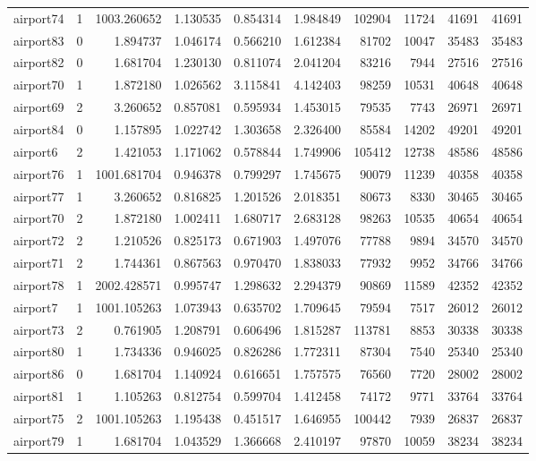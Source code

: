 \begin{longtable}{|l|r|r|r|r|r|r|r|r|r|}
airport74 & 1 & 1003.260652 & 1.130535 & 0.854314 & 1.984849 & 102904 & 11724 & 41691 & 41691 \\
airport83 & 0 & 1.894737 & 1.046174 & 0.566210 & 1.612384 & 81702 & 10047 & 35483 & 35483 \\
airport82 & 0 & 1.681704 & 1.230130 & 0.811074 & 2.041204 & 83216 & 7944 & 27516 & 27516 \\
airport70 & 1 & 1.872180 & 1.026562 & 3.115841 & 4.142403 & 98259 & 10531 & 40648 & 40648 \\
airport69 & 2 & 3.260652 & 0.857081 & 0.595934 & 1.453015 & 79535 & 7743 & 26971 & 26971 \\
airport84 & 0 & 1.157895 & 1.022742 & 1.303658 & 2.326400 & 85584 & 14202 & 49201 & 49201 \\
airport6 & 2 & 1.421053 & 1.171062 & 0.578844 & 1.749906 & 105412 & 12738 & 48586 & 48586 \\
airport76 & 1 & 1001.681704 & 0.946378 & 0.799297 & 1.745675 & 90079 & 11239 & 40358 & 40358 \\
airport77 & 1 & 3.260652 & 0.816825 & 1.201526 & 2.018351 & 80673 & 8330 & 30465 & 30465 \\
airport70 & 2 & 1.872180 & 1.002411 & 1.680717 & 2.683128 & 98263 & 10535 & 40654 & 40654 \\
airport72 & 2 & 1.210526 & 0.825173 & 0.671903 & 1.497076 & 77788 & 9894 & 34570 & 34570 \\
airport71 & 2 & 1.744361 & 0.867563 & 0.970470 & 1.838033 & 77932 & 9952 & 34766 & 34766 \\
airport78 & 1 & 2002.428571 & 0.995747 & 1.298632 & 2.294379 & 90869 & 11589 & 42352 & 42352 \\
airport7 & 1 & 1001.105263 & 1.073943 & 0.635702 & 1.709645 & 79594 & 7517 & 26012 & 26012 \\
airport73 & 2 & 0.761905 & 1.208791 & 0.606496 & 1.815287 & 113781 & 8853 & 30338 & 30338 \\
airport80 & 1 & 1.734336 & 0.946025 & 0.826286 & 1.772311 & 87304 & 7540 & 25340 & 25340 \\
airport86 & 0 & 1.681704 & 1.140924 & 0.616651 & 1.757575 & 76560 & 7720 & 28002 & 28002 \\
airport81 & 1 & 1.105263 & 0.812754 & 0.599704 & 1.412458 & 74172 & 9771 & 33764 & 33764 \\
airport75 & 2 & 1001.105263 & 1.195438 & 0.451517 & 1.646955 & 100442 & 7939 & 26837 & 26837 \\
airport79 & 1 & 1.681704 & 1.043529 & 1.366668 & 2.410197 & 97870 & 10059 & 38234 & 38234 \\

\end{longtable}
